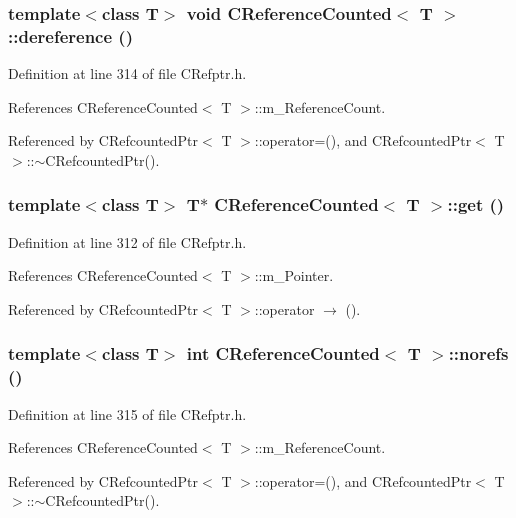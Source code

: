 \subsubsection{\setlength{\rightskip}{0pt plus 5cm}template$<$class T$>$ void CReference\-Counted$<$ T $>$::dereference ()\hspace{0.3cm}{\tt  [inline]}}\label{classCReferenceCounted_a5}




Definition at line 314 of file CRefptr.h.

References CReference\-Counted$<$ T $>$::m\_\-Reference\-Count.

Referenced by CRefcounted\-Ptr$<$ T $>$::operator=(), and CRefcounted\-Ptr$<$ T $>$::$\sim$CRefcounted\-Ptr().
\subsubsection{\setlength{\rightskip}{0pt plus 5cm}template$<$class T$>$ T$\ast$ CReference\-Counted$<$ T $>$::get ()\hspace{0.3cm}{\tt  [inline]}}\label{classCReferenceCounted_a3}




Definition at line 312 of file CRefptr.h.

References CReference\-Counted$<$ T $>$::m\_\-Pointer.

Referenced by CRefcounted\-Ptr$<$ T $>$::operator $\rightarrow$ ().
\subsubsection{\setlength{\rightskip}{0pt plus 5cm}template$<$class T$>$ int CReference\-Counted$<$ T $>$::norefs ()\hspace{0.3cm}{\tt  [inline]}}\label{classCReferenceCounted_a6}




Definition at line 315 of file CRefptr.h.

References CReference\-Counted$<$ T $>$::m\_\-Reference\-Count.

Referenced by CRefcounted\-Ptr$<$ T $>$::operator=(), and CRefcounted\-Ptr$<$ T $>$::$\sim$CRefcounted\-Ptr().
